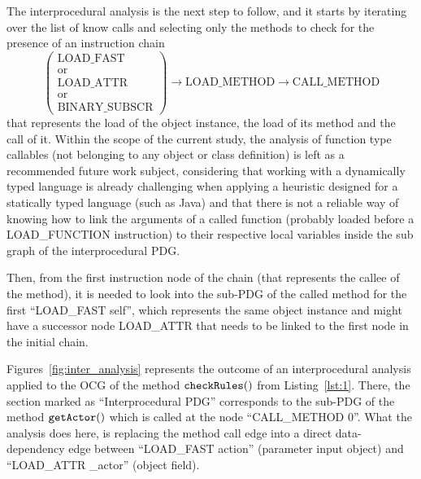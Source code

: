\documentclass[%
  chapterprefix=false,%
  open=right,%
  twoside=true,%
  paper=a4,%
  logofile={Figures/logo.png},%
  thesistype=master,%
  UKenglish,%
]{se2thesis}
\newcommand{\callable}[2][]{\(\text{\texttt{#2}}(#1)\)}
\begin{document}
The interprocedural analysis is the next step to follow, and it starts by iterating over the list of know calls and selecting only the methods to check for the presence of an instruction chain 
\[\begin{pmatrix} \text{LOAD\_FAST} \\ \text{or} \\ \text{LOAD\_ATTR} \\ \text{or} \\ \text{BINARY\_SUBSCR} \end{pmatrix} \rightarrow \text{LOAD\_METHOD} \rightarrow \text{CALL\_METHOD}\]
that represents the load of the object instance, the load of its method and the call of it.
Within the scope of the current study, the analysis of function type callables (not belonging to any object or class definition) is left as a recommended future work subject, considering that working with a dynamically typed language is already challenging when applying a heuristic designed for a statically typed language (such as Java) and that there is not a reliable way of knowing how to link the arguments of a called function (probably loaded before a LOAD\_FUNCTION instruction) to their respective local variables inside the sub graph of the interprocedural PDG.

Then, from the first instruction node of the chain (that represents the callee of the method), it is needed to look into the sub-PDG of the called method for the first ``LOAD\_FAST self'', which represents the same object instance and might have a successor node LOAD\_ATTR that needs to be linked to the first node in the initial chain.

Figures~\ref{fig:inter_analysis} represents the outcome of an interprocedural analysis applied to the OCG of the method \callable{checkRules} from Listing~\ref{lst:1}.
There, the section marked as ``Interprocedural PDG'' corresponds to the sub-PDG of the method \callable{getActor} which is called at the node ``CALL\_METHOD 0''.
What the analysis does here, is replacing the method call edge into a direct data-dependency edge between ``LOAD\_FAST action'' (parameter input object) and ``LOAD\_ATTR \_actor'' (object field).
\end{document}
